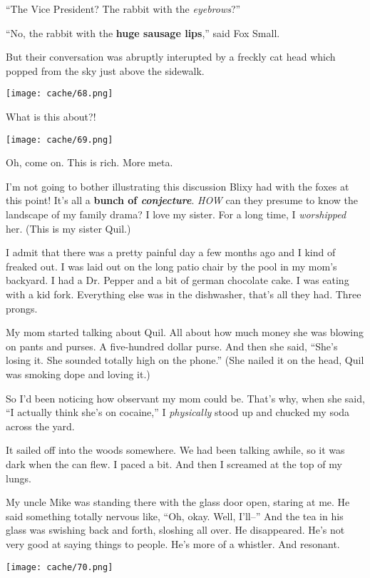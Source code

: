\documentclass[12pt,twoside]{report}
\begin{document}
``The Vice President?  The rabbit with the {\em eyebrows}?''

``No, the rabbit with the {\bf huge sausage lips},'' said Fox Small.

But their conversation was abruptly interupted by a freckly cat head
which popped from the sky just above the sidewalk.

	\texttt{[image: cache/68.png]}

What is this about?!

	\texttt{[image: cache/69.png]}

Oh, come on.  This is rich.  More meta.

I'm not going to bother illustrating this discussion Blixy had with
the foxes at this point! It's all a {\bf bunch of {\em conjecture}}.
{\em HOW} can they presume to know the landscape of my family drama? I
love my sister.  For a long time, I {\em worshipped} her. (This is my
sister Quil.)

I admit that there was a pretty painful day a few months ago and I
kind of freaked out.  I was laid out on the long patio chair by the
pool in my mom's backyard.  I had a Dr. Pepper and a bit of german
chocolate cake.  I was eating with a kid fork.  Everything else was in
the dishwasher, that's all they had.  Three prongs.

My mom started talking about Quil.  All about how much money she was
blowing on pants and purses. A five-hundred dollar purse.  And then
she said, ``She's losing it. She sounded totally high on the phone.''
(She nailed it on the head, Quil was smoking dope and loving it.)

So I'd been noticing how observant my mom could be.  That's why, when
she said, ``I actually think she's on cocaine,'' I {\em physically}
stood up and chucked my soda across the yard.

It sailed off into the woods somewhere.  We had been talking awhile,
so it was dark when the can flew. I paced a bit.  And then I screamed
at the top of my lungs.

My uncle Mike was standing there with the glass door open, staring at
me.  He said something totally nervous like, ``Oh, okay.  Well,
I'll--'' And the tea in his glass was swishing back and forth,
sloshing all over.  He disappeared.  He's not very good at saying
things to people.  He's more of a whistler.  And resonant.

	\texttt{[image: cache/70.png]}
\end{document}
